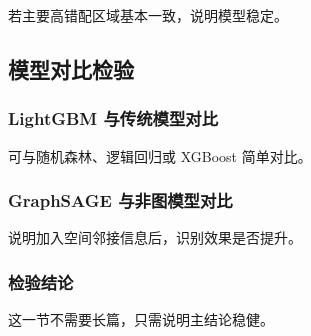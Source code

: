 若主要高错配区域基本一致，说明模型稳定。

\subsection{模型对比检验}

\subsubsection{LightGBM 与传统模型对比}

可与随机森林、逻辑回归或 XGBoost 简单对比。

\subsubsection{GraphSAGE 与非图模型对比}

说明加入空间邻接信息后，识别效果是否提升。

\subsubsection{检验结论}

这一节不需要长篇，只需说明主结论稳健。
